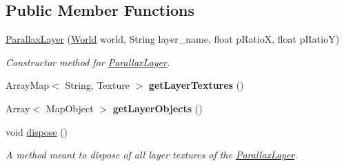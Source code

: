 \subsection*{Public Member Functions}
\begin{DoxyCompactItemize}
\item 
\hyperlink{classnl_1_1arjanfrans_1_1mario_1_1view_1_1ParallaxLayer_aec238fa2067afb4e286f8db8b616aeac}{Parallax\+Layer} (\hyperlink{classnl_1_1arjanfrans_1_1mario_1_1model_1_1World}{World} world, String layer\+\_\+name, float p\+RatioX, float p\+RatioY)
\begin{DoxyCompactList}\small\item\em Constructor method for \hyperlink{classnl_1_1arjanfrans_1_1mario_1_1view_1_1ParallaxLayer}{Parallax\+Layer}. \end{DoxyCompactList}\item 
\mbox{\label{classnl_1_1arjanfrans_1_1mario_1_1view_1_1ParallaxLayer_a1d299e94c27d8fd0b37d37110f52ff60}} 
Array\+Map$<$ String, Texture $>$ {\bfseries get\+Layer\+Textures} ()
\item 
\mbox{\label{classnl_1_1arjanfrans_1_1mario_1_1view_1_1ParallaxLayer_ad211dbd4512b3560a25c2d09f95fa260}} 
Array$<$ Map\+Object $>$ {\bfseries get\+Layer\+Objects} ()
\item 
\mbox{\label{classnl_1_1arjanfrans_1_1mario_1_1view_1_1ParallaxLayer_a0d7584aed429cdc488e32ec4eae94df1}} 
void \hyperlink{classnl_1_1arjanfrans_1_1mario_1_1view_1_1ParallaxLayer_a0d7584aed429cdc488e32ec4eae94df1}{dispose} ()
\begin{DoxyCompactList}\small\item\em A method meant to dispose of all layer textures of the \hyperlink{classnl_1_1arjanfrans_1_1mario_1_1view_1_1ParallaxLayer}{Parallax\+Layer}. \end{DoxyCompactList}\end{DoxyCompactItemize}
